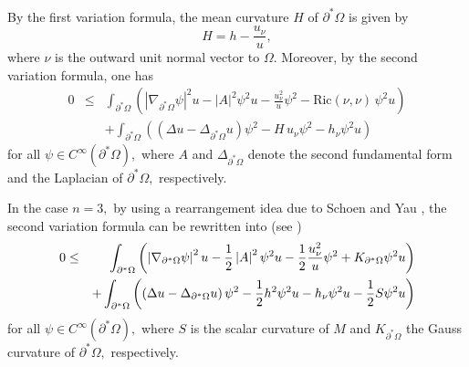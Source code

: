 \documentclass{amsart}
\numberwithin{equation}{section}
\begin{document}
By the first variation formula,
the mean curvature $H$ of $\partial ^{\ast }\Omega$ is given by
\begin{equation}
H=h-\frac{u_{\nu }}{u},  \label{a2}
\end{equation}
where $\nu$ is the outward unit normal vector to $\Omega.$
Moreover, by the second variation formula, one has
\begin{eqnarray*} 
0 &\leq &\int_{\partial ^{\ast }\Omega }\left( \left\vert \nabla _{\partial ^{\ast }\Omega 
}\psi \right\vert ^{2}u-\left\vert A\right\vert ^{2}\psi ^{2}u-
\frac{u_{\nu }^{2}}{u}\psi ^{2}-\mathrm{Ric}(\nu, \nu)\,\psi
^{2}u\right) \\
&&+\int_{\partial ^{\ast }\Omega }\left( \left( \Delta u-\Delta _{\partial
^{\ast }\Omega }u\right) \psi ^{2}-H\,u_{\nu}\psi ^{2}-h_{\nu }\psi
^{2}u\right)
\end{eqnarray*}
for all $\psi \in C^{\infty }\left( \partial ^{\ast }\Omega \right),$ where 
$A$ and $\Delta _{\partial ^{\ast }\Omega }$ denote the second fundamental form
and the Laplacian of $\partial ^{\ast}\Omega,$ respectively.

In the case $n=3,$ by using a rearrangement idea due to Schoen and Yau \cite{SY}, 
the second variation formula can be rewritten into (see \cite{CL})
\begin{eqnarray}\label{a3}
0 &\leq &\int_{\partial ^{\ast }\Omega }\left( \left\vert \nabla _{\partial ^{\ast }\Omega 
}\psi \right\vert ^{2}u-\frac{1}{2}\left\vert A\right\vert ^{2}\psi ^{2}u-%
\frac{1}{2}\frac{u_{\nu }^{2}}{u}\psi ^{2}+K_{\partial ^{\ast }\Omega }\psi
^{2}u\right) \\
&&+\int_{\partial ^{\ast }\Omega }\left( \left( \Delta u-\Delta _{\partial
^{\ast }\Omega }u\right) \psi ^{2}-\frac{1}{2}h^{2}\psi ^{2}u-h_{\nu }\psi
^{2}u-\frac{1}{2}S\psi ^{2}u\right) \notag
\end{eqnarray}
for all $\psi \in C^{\infty }\left( \partial ^{\ast }\Omega \right),$ where $S$ is the scalar curvature of $M$ and
$K_{\partial^{\ast }\Omega }$ the Gauss curvature of $\partial ^{\ast}\Omega,$ respectively.
\end{document}
